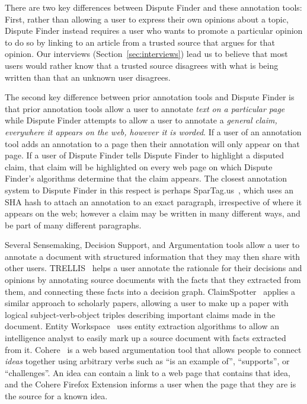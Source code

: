\documentclass{www2010-submission}
\begin{document}
There are two key differences between Dispute Finder and these annotation tools: First, rather than allowing a user to express their own opinions about a topic, Dispute Finder instead requires a user who wants to promote a particular opinion to do so by linking to an article from a trusted source that argues for that opinion. Our interviews (Section~\ref{sec:interviews}) lead us to believe that most users would rather know that a trusted source disagrees with what is being written than that an unknown user disagrees.

The second key difference between prior annotation tools and Dispute Finder is that prior annotation tools allow a user to annotate {\it text on a particular page} while Dispute Finder attempts to allow a user to annotate a {\it general claim, everywhere it appears on the web, however it is worded}. If a user of an annotation tool adds an annotation to a page then their annotation will only appear on that page. If a user of Dispute Finder tells Dispute Finder to highlight a disputed claim, that claim will be highlighted on every web page on which Dispute Finder's algorithms determine that the claim appears. The closest annotation system to Dispute Finder in this respect is perhaps SparTag.us~\cite{Hong2009}, which uses an SHA hash to attach an annotation to an exact paragraph, irrespective of where it appears on the web; however a claim may be written in many different ways, and be part of many different paragraphs.

Several Sensemaking, Decision Support, and Argumentation tools allow a user to annotate a document with structured information that they may then share with other users. TRELLIS~\cite{Gil2002} helps a user annotate the rationale for their decisions and opinions by annotating source documents with the facts that they extracted from them, and connecting these facts into a decision graph. ClaimSpotter~\cite{Sereno2005,Sereno2004} applies a similar approach to scholarly papers, allowing a user to make up a paper with logical subject-verb-object triples describing important claims made in the document. Entity Workspace~\cite{Bier2006} uses entity extraction algorithms to allow an intelligence analyst to easily mark up a source document with facts extracted from it. Cohere~\cite{Shum2008} is a web based argumentation tool that allows people to connect {\it ideas} together using arbitrary verbs such as ``is an example of'', ``supports'', or ``challenges''. An idea can contain a link to a web page that contains that idea, and the Cohere Firefox Extension informs a user when the page that they are is the source for a known idea.
\end{document}
